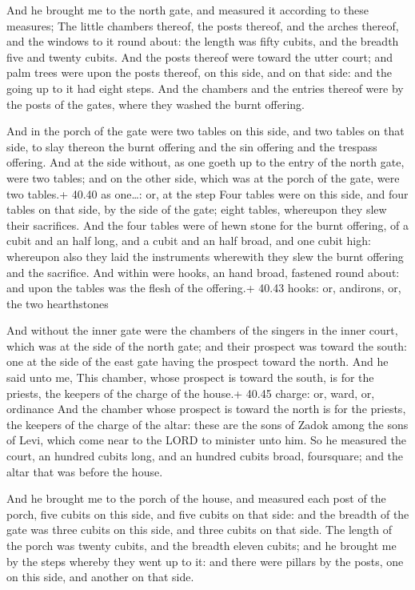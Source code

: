  And he brought me to the north gate, and measured it
according to these measures;  The little chambers thereof,
the posts thereof, and the arches thereof, and the windows to it round
about: the length was fifty cubits, and the breadth five and twenty
cubits.  And the posts thereof were toward the utter court;
and palm trees were upon the posts thereof, on this side, and on that
side: and the going up to it had eight steps.  And the
chambers and the entries thereof were by the posts of the gates, where
they washed the burnt offering.

 And in the porch of the gate were two tables on this
side, and two tables on that side, to slay thereon the burnt offering
and the sin offering and the trespass offering.  And at the
side without, as one goeth up to the entry of the north gate, were two
tables; and on the other side, which was at the porch of the gate, were
two tables.+ 40.40 as one\ldots: or, at the step  Four
tables were on this side, and four tables on that side, by the side of
the gate; eight tables, whereupon they slew their sacrifices.
 And the four tables were of hewn stone for the burnt
offering, of a cubit and an half long, and a cubit and an half broad,
and one cubit high: whereupon also they laid the instruments wherewith
they slew the burnt offering and the sacrifice.  And within
were hooks, an hand broad, fastened round about: and upon the tables was
the flesh of the offering.+ 40.43 hooks: or, andirons, or, the two
hearthstones

 And without the inner gate were the chambers of the
singers in the inner court, which was at the side of the north gate; and
their prospect was toward the south: one at the side of the east gate
having the prospect toward the north.  And he said unto me,
This chamber, whose prospect is toward the south, is for the priests,
the keepers of the charge of the house.+ 40.45 charge: or, ward, or,
ordinance  And the chamber whose prospect is toward the
north is for the priests, the keepers of the charge of the altar: these
are the sons of Zadok among the sons of Levi, which come near to the
LORD to minister unto him.  So he measured the court, an
hundred cubits long, and an hundred cubits broad, foursquare; and the
altar that was before the house.

 And he brought me to the porch of the house, and
measured each post of the porch, five cubits on this side, and five
cubits on that side: and the breadth of the gate was three cubits on
this side, and three cubits on that side.  The length of
the porch was twenty cubits, and the breadth eleven cubits; and he
brought me by the steps whereby they went up to it: and there were
pillars by the posts, one on this side, and another on that side.

